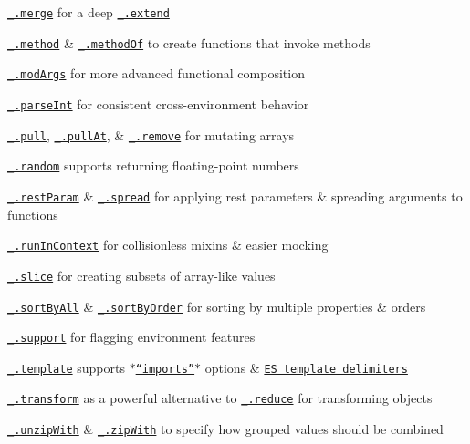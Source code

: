 \begin{DoxyItemize}
\item \href{https://lodash.com/docs#merge}{\tt \+\_\+.\+merge} for a deep \href{https://lodash.com/docs#extend}{\tt \+\_\+.\+extend}
\item \href{https://lodash.com/docs#method}{\tt \+\_\+.\+method} \& \href{https://lodash.com/docs#methodOf}{\tt \+\_\+.\+method\+Of} to create functions that invoke methods
\item \href{https://lodash.com/docs#modArgs}{\tt \+\_\+.\+mod\+Args} for more advanced functional composition
\item \href{https://lodash.com/docs#parseInt}{\tt \+\_\+.\+parse\+Int} for consistent cross-\/environment behavior
\item \href{https://lodash.com/docs#pull}{\tt \+\_\+.\+pull}, \href{https://lodash.com/docs#pullAt}{\tt \+\_\+.\+pull\+At}, \& \href{https://lodash.com/docs#remove}{\tt \+\_\+.\+remove} for mutating arrays
\item \href{https://lodash.com/docs#random}{\tt \+\_\+.\+random} supports returning floating-\/point numbers
\item \href{https://lodash.com/docs#restParam}{\tt \+\_\+.\+rest\+Param} \& \href{https://lodash.com/docs#spread}{\tt \+\_\+.\+spread} for applying rest parameters \& spreading arguments to functions
\item \href{https://lodash.com/docs#runInContext}{\tt \+\_\+.\+run\+In\+Context} for collisionless mixins \& easier mocking
\item \href{https://lodash.com/docs#slice}{\tt \+\_\+.\+slice} for creating subsets of array-\/like values
\item \href{https://lodash.com/docs#sortByAll}{\tt \+\_\+.\+sort\+By\+All} \& \href{https://lodash.com/docs#sortByOrder}{\tt \+\_\+.\+sort\+By\+Order} for sorting by multiple properties \& orders
\item \href{https://lodash.com/docs#support}{\tt \+\_\+.\+support} for flagging environment features
\item \href{https://lodash.com/docs#template}{\tt \+\_\+.\+template} supports \href{https://lodash.com/docs#templateSettings-imports}{\tt $\ast$“imports”$\ast$} options \& \href{http://people.mozilla.org/~jorendorff/es6-draft.html#sec-template-literal-lexical-components}{\tt E\+S template delimiters}
\item \href{https://lodash.com/docs#transform}{\tt \+\_\+.\+transform} as a powerful alternative to \href{https://lodash.com/docs#reduce}{\tt \+\_\+.\+reduce} for transforming objects
\item \href{https://lodash.com/docs#unzipWith}{\tt \+\_\+.\+unzip\+With} \& \href{https://lodash.com/docs#zipWith}{\tt \+\_\+.\+zip\+With} to specify how grouped values should be combined

\end{DoxyItemize}
